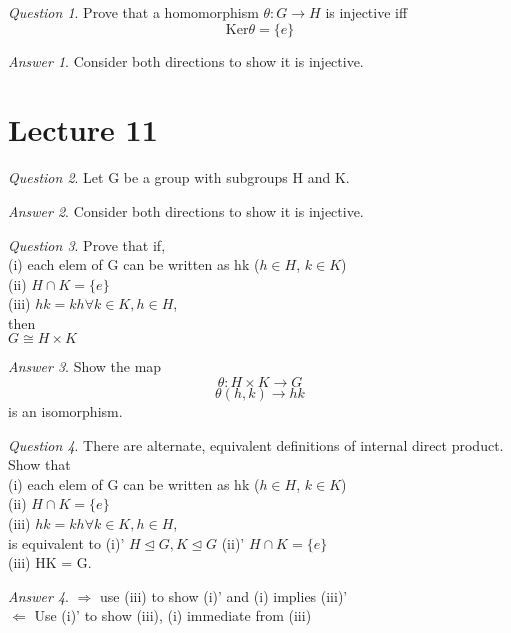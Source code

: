\documentclass[]{article}
\theoremstyle{remark}
\theoremstyle{qnstyle}
\newtheorem{question}{Question}
\theoremstyle{answerstyle}
\newtheorem*{answer}{Answer}
\begin{document}
{
    \begin{question}
        Prove that a homomorphism $\theta: G \to H$ is injective iff
         $$\text{Ker} \theta = \{ e \}$$
    \end{question}
    \begin{answer}
        Consider both directions to show it is injective.
    \end{answer}
}

\section* {Lecture 11}

{
    \begin{question}
        Let G be a group with subgroups H and K. 
    \end{question}
    \begin{answer}
        Consider both directions to show it is injective.
    \end{answer}
}

{
    \begin{question}
        Prove that if, \\
        (i) each elem of G can be written as hk ($h \in H$, $k \in K$)\\
        (ii) $H \cap K = \{ e\}$\\
        (iii) $hk = kh \forall k \in K, h \in H$, \\
        then \\
        $G \cong H \times K$
    \end{question}
    \begin{answer}
        Show the map $$\theta: H \times K \to G$$
        $$\theta (h,k) \to hk$$
        is an isomorphism. 
    \end{answer}
}

{
    \begin{question}
        There are alternate, equivalent definitions of internal direct product. \\
        Show that \\
        (i) each elem of G can be written as hk ($h \in H$, $k \in K$)\\
        (ii) $H \cap K = \{ e\}$\\
        (iii) $hk = kh \forall k \in K, h \in H$, \\
        is equivalent to
        (i)' $H \trianglelefteq G, K \trianglelefteq G$
        (ii)' $H \cap K = \{ e\}$\\
        (iii) HK = G.
    \end{question}
    \begin{answer}
        $\Rightarrow$ use (iii) to show (i)' and (i) implies (iii)'\\
        $\Leftarrow$ Use (i)' to show (iii), (i) immediate from (iii)
    \end{answer}
}
\end{document}
